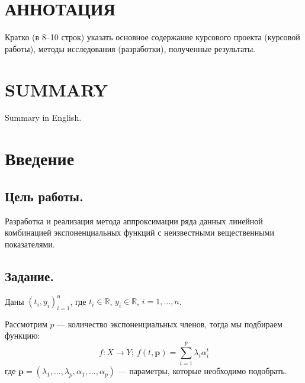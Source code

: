 \newpage

\section*{АННОТАЦИЯ}
\begin{minipage}[t][0.4\textheight][t]{0.9\linewidth}
	\setlength{\parindent}{1.25cm}
	\indent
	Кратко (в 8--10 строк) указать основное содержание курсового проекта (курсовой работы), методы исследования (разработки), полученные результаты.
\end{minipage}

\section*{SUMMARY}
\begin{minipage}[t][0.4\textheight][t]{0.9\linewidth}
	\setlength{\parindent}{1.25cm}
	\indent
	Summary in English.
\end{minipage}

\newpage

\let \savenumberline \numberline
\def \numberline#1{\savenumberline{#1.}}

\tableofcontents

\newpage

\section*{Введение}

\subsection*{Цель работы.}

Разработка и реализация метода аппроксимации ряда данных линейной комбинацией экспоненциальных функций с неизвестными вещественными показателями.

\subsection*{Задание.}
Даны $(t_i, y_i)_{i=1}^n$, где $t_i \in \mathbb{R}$, $y_i \in \mathbb{R}$, $i = 1, \ldots, n$.

Рассмотрим $p$ — количество экспоненциальных членов, тогда мы подбираем функцию:
$$
	f: X \to Y; \:
	f(t, \textbf{p}) =\sum_{i=1}^p\lambda_i\alpha_i^t
$$
где $\textbf{p} = (\lambda_1, \ldots, \lambda_p, \alpha_1, \ldots, \alpha_p)$ — параметры, которые необходимо подобрать.

